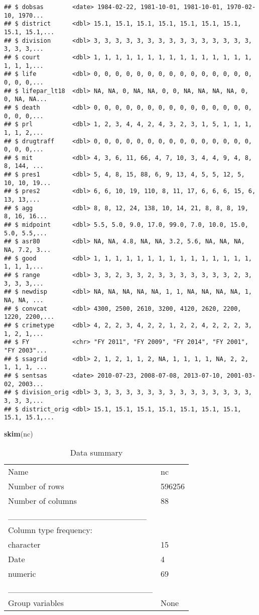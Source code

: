\documentclass[
]{article}
\newenvironment{Shaded}{\begin{snugshade}}{\end{snugshade}}
\newcommand{\KeywordTok}[1]{\textcolor[rgb]{0.13,0.29,0.53}{\textbf{#1}}}
\newcommand{\NormalTok}[1]{#1}
\begin{document}
\begin{verbatim}
## $ dobsas        <date> 1984-02-22, 1981-10-01, 1981-10-01, 1970-02-10, 1970...
## $ district      <dbl> 15.1, 15.1, 15.1, 15.1, 15.1, 15.1, 15.1, 15.1, 15.1,...
## $ division      <dbl> 3, 3, 3, 3, 3, 3, 3, 3, 3, 3, 3, 3, 3, 3, 3, 3, 3, 3,...
## $ court         <dbl> 1, 1, 1, 1, 1, 1, 1, 1, 1, 1, 1, 1, 1, 1, 1, 1, 1, 1,...
## $ life          <dbl> 0, 0, 0, 0, 0, 0, 0, 0, 0, 0, 0, 0, 0, 0, 0, 0, 0, 0,...
## $ lifepar_lt18  <dbl> NA, NA, 0, NA, NA, 0, 0, NA, NA, NA, NA, 0, 0, NA, NA...
## $ death         <dbl> 0, 0, 0, 0, 0, 0, 0, 0, 0, 0, 0, 0, 0, 0, 0, 0, 0, 0,...
## $ prl           <dbl> 1, 2, 3, 4, 4, 2, 4, 3, 2, 3, 1, 5, 1, 1, 1, 1, 1, 2,...
## $ drugtraff     <dbl> 0, 0, 0, 0, 0, 0, 0, 0, 0, 0, 0, 0, 0, 0, 0, 0, 0, 0,...
## $ mit           <dbl> 4, 3, 6, 11, 66, 4, 7, 10, 3, 4, 4, 9, 4, 8, 8, 144, ...
## $ pres1         <dbl> 5, 4, 8, 15, 88, 6, 9, 13, 4, 5, 5, 12, 5, 10, 10, 19...
## $ pres2         <dbl> 6, 6, 10, 19, 110, 8, 11, 17, 6, 6, 6, 15, 6, 13, 13,...
## $ agg           <dbl> 8, 8, 12, 24, 138, 10, 14, 21, 8, 8, 8, 19, 8, 16, 16...
## $ midpoint      <dbl> 5.5, 5.0, 9.0, 17.0, 99.0, 7.0, 10.0, 15.0, 5.0, 5.5,...
## $ asr80         <dbl> NA, NA, 4.8, NA, NA, 3.2, 5.6, NA, NA, NA, NA, 7.2, 3...
## $ good          <dbl> 1, 1, 1, 1, 1, 1, 1, 1, 1, 1, 1, 1, 1, 1, 1, 1, 1, 1,...
## $ range         <dbl> 3, 3, 2, 3, 3, 2, 3, 3, 3, 3, 3, 3, 3, 2, 3, 3, 3, 3,...
## $ newdisp       <dbl> NA, NA, NA, NA, NA, 1, 1, NA, NA, NA, NA, 1, NA, NA, ...
## $ convcat       <dbl> 4300, 2500, 2610, 3200, 4120, 2620, 2200, 1220, 2200,...
## $ crimetype     <dbl> 4, 2, 2, 3, 4, 2, 2, 1, 2, 2, 4, 2, 2, 2, 3, 1, 2, 1,...
## $ FY            <chr> "FY 2011", "FY 2009", "FY 2014", "FY 2001", "FY 2003"...
## $ ssagrid       <dbl> 2, 1, 2, 1, 1, 2, NA, 1, 1, 1, 1, NA, 2, 2, 1, 1, 1, ...
## $ sentsas       <date> 2010-07-23, 2008-07-08, 2013-07-10, 2001-03-02, 2003...
## $ division_orig <dbl> 3, 3, 3, 3, 3, 3, 3, 3, 3, 3, 3, 3, 3, 3, 3, 3, 3, 3,...
## $ district_orig <dbl> 15.1, 15.1, 15.1, 15.1, 15.1, 15.1, 15.1, 15.1, 15.1,...
\end{verbatim}

\begin{Shaded}
\begin{Highlighting}[]
\KeywordTok{skim}\NormalTok{(nc)}
\end{Highlighting}
\end{Shaded}

\begin{longtable}[]{@{}ll@{}}
\caption{Data summary}\tabularnewline
\toprule
\endhead
Name & nc\tabularnewline
Number of rows & 596256\tabularnewline
Number of columns & 88\tabularnewline
\_\_\_\_\_\_\_\_\_\_\_\_\_\_\_\_\_\_\_\_\_\_\_ &\tabularnewline
Column type frequency: &\tabularnewline
character & 15\tabularnewline
Date & 4\tabularnewline
numeric & 69\tabularnewline
\_\_\_\_\_\_\_\_\_\_\_\_\_\_\_\_\_\_\_\_\_\_\_\_ &\tabularnewline
Group variables & None\tabularnewline
\bottomrule
\end{longtable}
\end{document}
